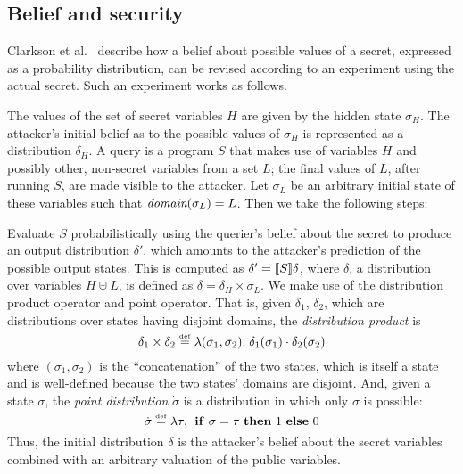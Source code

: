 \subsection{Belief and security}
\label{sec:experiment}

Clarkson et al.~\cite{clarkson09quantifying} describe how a belief
about possible values of a secret, expressed as a probability
distribution, can be revised according to an experiment using the
actual secret.  Such an experiment works as follows.

The values of the set of secret variables $ H $ are given by the hidden
state $\sigma_H$.  The attacker's initial belief as to the possible
values of $\sigma_H$ is represented as a distribution $ \delta_H $.  A
query is a program $ S $ that makes use of variables $ H $ and
possibly other, non-secret variables from a set $L$; the final values
of $L$, after running $S$, are made visible to the attacker.  Let
$\sigma_L$ be an arbitrary initial state of these variables such that
$\textit{domain}(\sigma_L) = L$.  Then we take the following steps:

 Evaluate $S$ probabilistically using the
querier's belief about the secret to produce an output distribution
$\delta'$, which amounts to the attacker's prediction of the possible output
states.  This is computed as $\delta' = [\![{S}]\!]{\delta} $, where
$\delta$, a distribution over variables $ H \uplus L $, is defined
as $ \delta = \delta_H \times \dot{\sigma}_L $.  We make use of
the distribution product operator and point operator.  
That is, given $
\delta_1 $, $ \delta_2 $, which are distributions over states having
disjoint domains, the \emph{distribution product} is
 $$ \delta_1 \times \delta_2 \stackrel{\smash{\scriptscriptstyle \mathrm{def}}}= \lambda(\sigma_1, \sigma_2)
 . \; \delta_1(\sigma_1) \cdot \delta_2(\sigma_2) $$ where
 $(\sigma_1,\sigma_2)$ is the ``concatenation''
 of the two states, which is itself a state and is
 well-defined because the two states' domains are disjoint.
And, given a
 state $ \sigma $, the \emph{point distribution} $ \dot{\sigma} $ is a
 distribution in which only $ \sigma $ is possible:
$$ \dot{\sigma} \stackrel{\smash{\scriptscriptstyle \mathrm{def}}}= \lambda \tau . \; \text{ \textbf{if} } \sigma = \tau \text{ \textbf{then} } 1 \text{ \textbf{else} }
0 $$ Thus, the initial distribution $\delta$ is the attacker's belief about the
secret variables combined with an arbitrary valuation of the
public variables.

